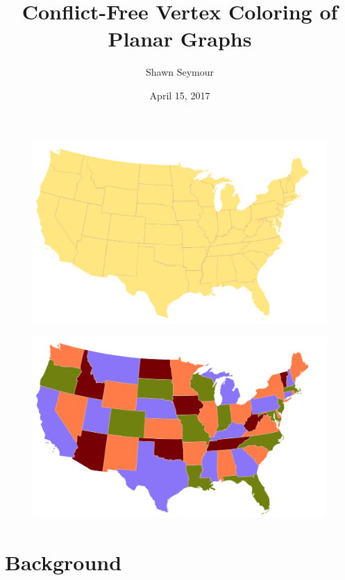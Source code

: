 \documentclass[xcolor=dvipsnames,aspectratio=1610]{beamer}
\title{Conflict-Free Vertex Coloring of Planar Graphs}
\date{April 15, 2017}
\author{Shawn Seymour}
\begin{document}
  \maketitle

  \begin{frame}
    \begin{figure}[h]
      \centering
      \includegraphics[width=14cm]{../figures/map-no-colors.pdf}
    \end{figure}
  \end{frame}

  \begin{frame}
    \begin{figure}[h]
      \centering
      \includegraphics[width=14cm]{../figures/map-colors.pdf}
    \end{figure}
  \end{frame}

  \section*{Background}
\end{document}
